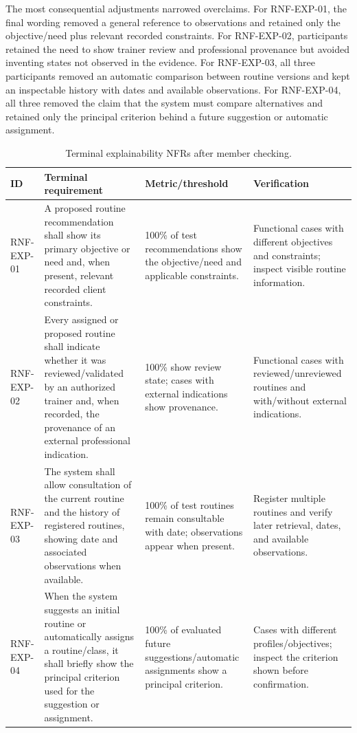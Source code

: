 \documentclass[pdflatex,sn-basic]{sn-jnl}
\begin{document}
The most consequential adjustments narrowed overclaims. For RNF-EXP-01, the final wording removed a general reference to observations and retained only the objective/need plus relevant recorded constraints. For RNF-EXP-02, participants retained the need to show trainer review and professional provenance but avoided inventing states not observed in the evidence. For RNF-EXP-03, all three participants removed an automatic comparison between routine versions and kept an inspectable history with dates and available observations. For RNF-EXP-04, all three removed the claim that the system must compare alternatives and retained only the principal criterion behind a future suggestion or automatic assignment.

\begin{table}[H]
\caption{Terminal explainability NFRs after member checking.}\label{tab:rnf}
\centering\small
\begin{tabularx}{\textwidth}{@{}p{1.5cm}X p{3.1cm}p{3.2cm}@{}}
\toprule
ID & Terminal requirement & Metric/threshold & Verification \\
\midrule
RNF-EXP-01 & A proposed routine recommendation shall show its primary objective or need and, when present, relevant recorded client constraints. & 100\% of test recommendations show the objective/need and applicable constraints. & Functional cases with different objectives and constraints; inspect visible routine information.\\
RNF-EXP-02 & Every assigned or proposed routine shall indicate whether it was reviewed/validated by an authorized trainer and, when recorded, the provenance of an external professional indication. & 100\% show review state; cases with external indications show provenance. & Functional cases with reviewed/unreviewed routines and with/without external indications.\\
RNF-EXP-03 & The system shall allow consultation of the current routine and the history of registered routines, showing date and associated observations when available. & 100\% of test routines remain consultable with date; observations appear when present. & Register multiple routines and verify later retrieval, dates, and available observations.\\
RNF-EXP-04 & When the system suggests an initial routine or automatically assigns a routine/class, it shall briefly show the principal criterion used for the suggestion or assignment. & 100\% of evaluated future suggestions/automatic assignments show a principal criterion. & Cases with different profiles/objectives; inspect the criterion shown before confirmation.\\
\bottomrule
\end{tabularx}
\end{table}
\end{document}
